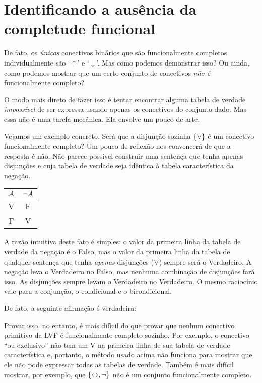 \section{Identificando a ausência da completude funcional}

De fato, os \emph{únicos} conectivos binários que são funcionalmente completos individualmente são `$\uparrow$' e `$\downarrow$'.
Mas como podemos demonstrar isso?
Ou ainda, como podemos mostrar que um certo conjunto de conectivos \emph{não é} funcionalmente completo?
 
O modo mais direto de fazer isso é tentar encontrar alguma tabela de verdade \emph{impossível} de ser expressa usando apenas os conectivos do conjunto dado.
Mas essa não é uma tarefa mecânica.
Ela envolve um pouco de arte.

Vejamos um exemplo concreto.
Será que a disjunção sozinha $\{\vee\}$ é um conectivo funcionalmente completo?
Um pouco de reflexão nos convencerá de que a resposta é não.
Não parece possível construir uma sentença que tenha apenas disjunções e cuja tabela de verdade seja idêntica à tabela característica da negação.
				\begin{center}
				\begin{tabular}{c | c}
				$\mathcal{A}$ & $\neg \mathcal{A}$\\
				\hline
				 V & F \\
				 F & V
				\end{tabular}
				\end{center}
A razão intuitiva deste fato é simples: o valor da primeira linha da tabela de verdade da negação é o Falso, mas o valor da primeira linha da tabela de qualquer sentença que tenha \emph{apenas} disjunções ($\vee$) sempre será o Verdadeiro.
A negação leva o Verdadeiro no Falso, mas nenhuma combinação de disjunções fará isso.
As disjunções sempre levam o Verdadeiro no Verdadeiro.
O mesmo raciocínio vale para a conjunção, o condicional e o bicondicional.

De fato, a seguinte afirmação é verdadeira:        
        

Provar isso, no entanto, é mais difícil do que provar que nenhum conectivo primitivo da LVF é funcionalmente completo sozinho.
Por exemplo, o conectivo ``ou exclusivo'' não tem um V na primeira linha de sua tabela de verdade característica e, portanto, o método usado acima não funciona para mostrar que ele não pode expressar todas as tabelas de verdade.
Também é mais difícil mostrar, por exemplo, que  $\{\leftrightarrow, \neg\}$ não é um conjunto funcionalmente completo.


